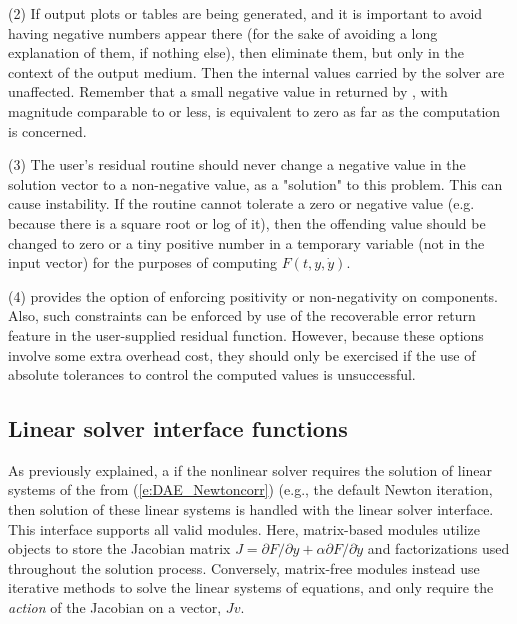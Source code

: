(2) If output plots or tables are being generated, and it is important
to avoid having negative numbers appear there (for the sake of avoiding
a long explanation of them, if nothing else), then eliminate them, but
only in the context of the output medium.  Then the internal values carried
by the solver are unaffected.  Remember that a small negative value in 
returned by {\ida}, with magnitude comparable to  or less,
is equivalent to zero as far as the computation is concerned.

(3) The user's residual routine  should never change a
negative value in the solution vector  to a non-negative value,
as a "solution" to this problem.  This can cause instability.  If the
 routine cannot tolerate a zero or negative value (e.g. because
there is a square root or log of it), then the offending value should
be changed to zero or a tiny positive number in a temporary variable
(not in the input  vector) for the purposes of computing $F(t,y,\dot{y})$.

(4) {\ida} provides the option of enforcing positivity or non-negativity
on components.  Also, such constraints can be enforced by use of the
recoverable error return feature in the user-supplied residual function.
However, because these options involve some extra overhead cost, they
should only be exercised if the use of absolute tolerances to control
the computed values is unsuccessful.
\subsection{Linear solver interface functions}\label{sss:lin_solv_init}

As previously explained, a if the nonlinear solver requires the solution of
linear systems of the from (\ref{e:DAE_Newtoncorr}) (e.g., the default Newton
iteration, then solution of these linear systems is handled with the
{\idals} linear solver interface.  This interface supports all valid
{\sunlinsol} modules.  Here, matrix-based {\sunlinsol} modules utilize
{\sunmatrix} objects to store the Jacobian matrix
$J = \partial{F}/\partial{y} + \alpha \partial{F}/\partial{\dot{y}}$
and factorizations used throughout the solution process.  Conversely,
matrix-free {\sunlinsol} modules instead use iterative methods to
solve the linear systems of equations, and only require the
\emph{action} of the Jacobian on a vector, $Jv$.

